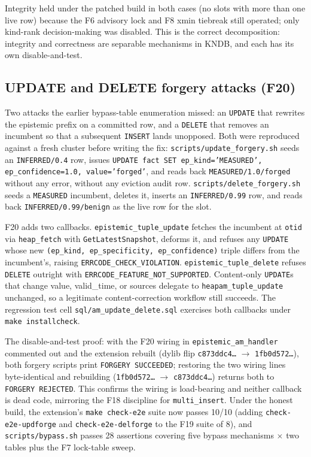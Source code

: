 \documentclass[sigconf, nonacm]{acmart}
\begin{document}
Integrity held under the patched build in both cases (no slots with more than one live row) because the F6 advisory lock and F8 xmin tiebreak still operated; only kind-rank decision-making was disabled. This is the correct decomposition: integrity and correctness are separable mechanisms in KNDB, and each has its own disable-and-test.

\subsection{UPDATE and DELETE forgery attacks (F20)}
\label{sec:eval-updateDelete}
Two attacks the earlier bypass-table enumeration missed: an \texttt{UPDATE} that rewrites the epistemic prefix on a committed row, and a \texttt{DELETE} that removes an incumbent so that a subsequent \texttt{INSERT} lands unopposed. Both were reproduced against a fresh cluster before writing the fix: \texttt{scripts/update\_forgery.sh} seeds an \texttt{INFERRED/0.4} row, issues \texttt{UPDATE fact SET ep\_kind='MEASURED', ep\_confidence=1.0, value='forged'}, and reads back \texttt{MEASURED/1.0/forged} without any error, without any eviction audit row. \texttt{scripts/delete\_forgery.sh} seeds a \texttt{MEASURED} incumbent, deletes it, inserts an \texttt{INFERRED/0.99} row, and reads back \texttt{INFERRED/0.99/benign} as the live row for the slot.

F20 adds two callbacks. \texttt{epistemic\_tuple\_update} fetches the incumbent at \texttt{otid} via \texttt{heap\_fetch} with \texttt{GetLatestSnapshot}, deforms it, and refuses any \texttt{UPDATE} whose new \texttt{(ep\_kind, ep\_specificity, ep\_confidence)} triple differs from the incumbent's, raising \texttt{ERRCODE\_CHECK\_VIOLATION}. \texttt{epistemic\_tuple\_delete} refuses \texttt{DELETE} outright with \texttt{ERRCODE\_FEATURE\_NOT\_SUPPORTED}. Content-only \texttt{UPDATE}s that change value, valid\_time, or sources delegate to \texttt{heapam\_tuple\_update} unchanged, so a legitimate content-correction workflow still succeeds. The regression test cell \texttt{sql/am\_update\_delete.sql} exercises both callbacks under \texttt{make installcheck}.

The disable-and-test proof: with the F20 wiring in \texttt{epistemic\_am\_handler} commented out and the extension rebuilt (dylib flip \texttt{c873ddc4\ldots} $\to$ \texttt{1fb0d572\ldots}), both forgery scripts print \texttt{FORGERY SUCCEEDED}; restoring the two wiring lines byte-identical and rebuilding (\texttt{1fb0d572\ldots} $\to$ \texttt{c873ddc4\ldots}) returns both to \texttt{FORGERY REJECTED}. This confirms the wiring is load-bearing and neither callback is dead code, mirroring the F18 discipline for \texttt{multi\_insert}. Under the honest build, the extension's \texttt{make check-e2e} suite now passes 10/10 (adding \texttt{check-e2e-updforge} and \texttt{check-e2e-delforge} to the F19 suite of 8), and \texttt{scripts/bypass.sh} passes 28 assertions covering five bypass mechanisms $\times$ two tables plus the F7 lock-table sweep.
\end{document}
